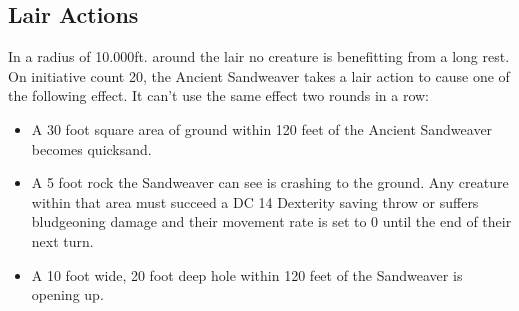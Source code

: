 \documentclass[a4paper,openany,twoside,twocolumn]{book}
\begin{document}
\subsection*{Lair Actions}
In a radius of 10.000ft. around the lair no creature is benefitting from a long rest.\\
On initiative count 20, the Ancient Sandweaver takes a lair action to cause one of the following effect. It can't use the same effect two rounds in a row:
\begin{itemize}
	\item A 30 foot square area of ground within 120 feet of the Ancient Sandweaver becomes quicksand.
	\item A 5 foot rock the Sandweaver can see is crashing to the ground. Any creature within that area must succeed a DC 14 Dexterity saving throw or suffers  bludgeoning damage and their movement rate is set to 0 until the end of their next turn.
	\item A 10 foot wide, 20 foot deep hole within 120 feet of the Sandweaver is opening up.
\end{itemize}
\end{document}
